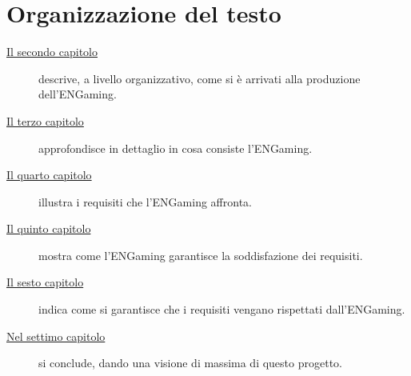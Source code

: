 \section{Organizzazione del testo}

\begin{description}
    \item[{\hyperref[cap:processi-metodologie]{Il secondo capitolo}}] descrive, a livello organizzativo, come si è arrivati alla produzione dell'ENGaming.
    
    \item[{\hyperref[cap:descrizione-stage]{Il terzo capitolo}}] approfondisce in dettaglio in cosa consiste l'ENGaming.
    
    \item[{\hyperref[cap:analisi-requisiti]{Il quarto capitolo}}] illustra i requisiti che l'ENGaming affronta.
    
    \item[{\hyperref[cap:progettazione-codifica]{Il quinto capitolo}}] mostra come l'ENGaming garantisce la soddisfazione dei requisiti.
    
    \item[{\hyperref[cap:verifica-validazione]{Il sesto capitolo}}] indica come si garantisce che i requisiti vengano rispettati dall'ENGaming.
    
    \item[{\hyperref[cap:conclusioni]{Nel settimo capitolo}}] si conclude, dando una visione di massima di questo progetto.
\end{description}

